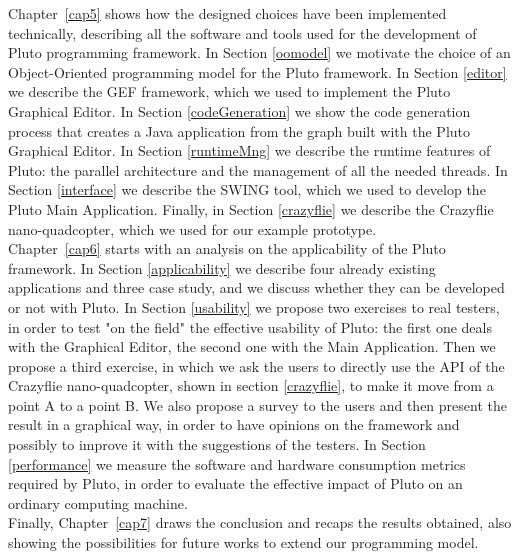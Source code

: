 Chapter~\ref{cap5} shows how the designed choices have been implemented technically, describing all the software and tools used for the development of Pluto programming framework.
In Section \ref{oomodel} we motivate the choice of an Object-Oriented programming model for the Pluto framework.
In Section \ref{editor} we describe the GEF framework, which we used to implement the Pluto Graphical Editor.
In Section \ref{codeGeneration} we show the code generation process that creates a Java application from the graph built with the Pluto Graphical Editor.
In Section \ref{runtimeMng} we describe the runtime features of Pluto:
the parallel architecture and the management of all the needed threads.
In Section \ref{interface} we describe the SWING tool, which we used to develop the Pluto Main Application.
Finally, in Section \ref{crazyflie} we describe the Crazyflie nano-quadcopter, which we used for our example prototype.
\\

Chapter~\ref{cap6} starts with an analysis on the applicability of the Pluto framework.
In Section \ref{applicability} we describe four already existing applications and three case study, and we discuss whether they can be developed or not with Pluto. 
In Section \ref{usability} we propose two exercises to real testers, in order to test "on the field" the effective usability of Pluto:
the first one deals with the Graphical Editor, the second one with the Main Application.
Then we propose a third exercise, in which we ask the users to directly use the API of the Crazyflie nano-quadcopter, shown in section \ref{crazyflie}, to make it move from a point A to a point B.
We also propose a survey to the users and then present the result in a graphical way, in order to have opinions on the framework and possibly to improve it with the suggestions of the testers.
In Section \ref{performance} we measure the software and hardware consumption metrics required by Pluto, in order to evaluate the effective impact of Pluto on an ordinary computing machine.
\\

Finally, Chapter~\ref{cap7} draws the conclusion and recaps the results obtained, also showing the possibilities for future works to extend our programming model.